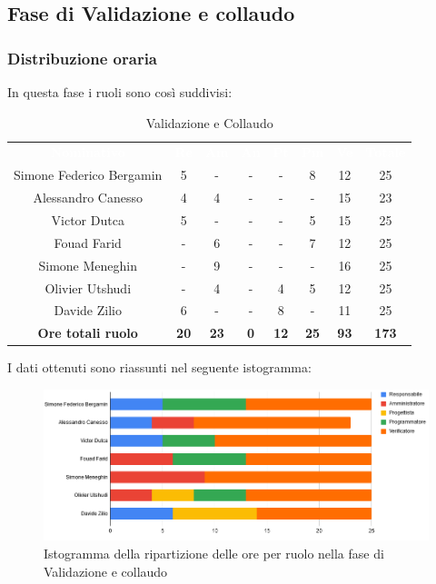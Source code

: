 
\subsection{Fase di Validazione e collaudo}
\subsubsection{Distribuzione oraria}
In questa fase i ruoli sono così suddivisi:

\begin{table}[H]
\centering\renewcommand{\arraystretch}{1.5}
\caption{Validazione e Collaudo}
\vspace{0.2cm}
\begin{tabular}{ c | c | c | c | c | c | c | c }
\rowcolor{redafk}
\textcolor{white}{\textbf{Nominativo}} & \textcolor{white}{\textbf{Re}} & 
\textcolor{white}{\textbf{Am}} & \textcolor{white}{\textbf{An}} &
\textcolor{white}{\textbf{Pt}} & \textcolor{white}{\textbf{Pm}} &
\textcolor{white}{\textbf{Ve}} & \textcolor{white}{\textbf{Totale}} \\
Simone Federico Bergamin 	& 5 	& - 	& - 	& - 	& 8 	& 12 	& 25 \\
Alessandro Canesso 			& 4 	& 4 	& - 	& - 	& - 	& 15 	& 23 \\
Victor Dutca 				& 5 	& - 	& - 	& - 	& 5 	& 15 	& 25 \\
Fouad Farid					& - 	& 6 	& - 	& - 	& 7 	& 12 	& 25 \\
Simone Meneghin 			& - 	& 9 	& - 	& - 	& - 	& 16 	& 25 \\
Olivier Utshudi 			& - 	& 4 	& - 	& 4 	& 5 	& 12 	& 25 \\
Davide Zilio 				& 6 	& - 	& - 	& 8 	& - 	& 11 	& 25 \\
\rowcolor{lastrowcolor}
\textbf{Ore totali ruolo} & \textbf{20} & \textbf{23} & \textbf{0} & \textbf{12} & \textbf{25} & \textbf{93} & \textbf{173} \\
\end{tabular}
\end{table}

I dati ottenuti sono riassunti nel seguente istogramma: 
\begin{figure}[H]
\centering
\includegraphics[scale=0.60]{img/grafici/tabella_fase_val_col.png}
\caption{Istogramma della ripartizione delle ore per ruolo nella fase di Validazione e collaudo}
\end{figure}

